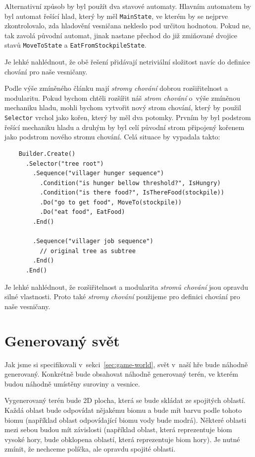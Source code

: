 Alternativní způsob by byl použít dva stavové automaty. Hlavním automatem by byl automat řešící hlad, který by měl \texttt{MainState}, ve kterém by se nejprve zkontrolovalo, zda hladovění vesničana nekleslo pod určitou hodnotou. Pokud ne, tak zavolá původní automat, jinak nastane přechod do již zmiňované dvojice stavů \texttt{MoveToState} a \texttt{EatFromStockpileState}.

Je lehké nahlédnout, že obě řešení přidávají netriviální složitost navíc do definice chování pro naše vesničany.

Podle výše zmíněného článku mají \textit{stromy chování} dobrou rozšiřitelnost a modularitu. Pokud bychom chtěli rozšířit náš \textit{strom chování} o~výše zmíněnou mechaniku hladu, mohli bychom vytvořit nový strom chování, který by použil \texttt{Selector} vrchol jako kořen, který by měl dva potomky. Prvním by byl podstrom řešící mechaniku hladu a druhým by byl celí původní strom připojený kořenem jako podstrom nového stromu chování. Celá situace by vypadala takto:

\begin{verbatim}
    Builder.Create()
      .Selector("tree root")
        .Sequence("villager hunger sequence")
          .Condition("is hunger bellow threshold?", IsHungry)
          .Condition("is there food?", IsThereFood(stockpile))
          .Do("go to get food", MoveTo(stockpile))
          .Do("eat food", EatFood)
        .End()

        .Sequence("villager job sequence")
          // original tree as subtree
        .End()
      .End()
\end{verbatim}

Je lehké nahlédnout, že rozšiřitelnost a modularita \textit{stromů chování} jsou opravdu silné vlastnosti. Proto také \textit{stromy chování} použijeme pro definici chování pro naše vesničany.


\section{Generovaný svět}
\label{sec:terrain}
Jak jsme si specifikovali v~sekci~\ref{sec:game-world}, svět v~naší hře bude náhodně generovaný. Konkrétně bude obsahovat náhodně generovaný terén, ve kterém budou náhodně umístěny suroviny a vesnice.

Vygenerovaný terén bude 2D plocha, která se bude skládat ze spojitých oblastí. Každá oblast bude odpovídat nějakému biomu a bude mít barvu podle tohoto biomu (například oblast odpovídající biomu vody bude modrá). Některé oblasti mezi sebou budou mít závislosti (například oblast, která reprezentuje biom vysoké hory, bude obklopena oblastí, která reprezentuje biom hory). Je nutné zmínit, že nechceme políčka, ale opravdu spojité oblasti.

